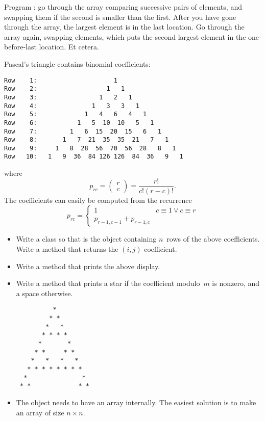 \begin{exercise}
  Program : go through the array comparing
  successive pairs of elements, and swapping them if the second is
  smaller than the first. After you have gone through the array, the
  largest element is in the last location. Go through the array again,
  swapping elements, which puts the second largest element in the
  one-before-last location. Et cetera.
\end{exercise}

\begin{block}{Pascal's triangle}
  \label{sl:pascal-def}
  \small
   contains binomial coefficients:
{\scriptsize
\begin{verbatim}
Row    1:                     1
Row    2:                   1   1
Row    3:                 1   2   1
Row    4:               1   3   3   1
Row    5:             1   4   6   4   1
Row    6:           1   5  10  10   5   1
Row    7:         1   6  15  20  15   6   1
Row    8:       1   7  21  35  35  21   7   1
Row    9:     1   8  28  56  70  56  28   8   1
Row   10:   1   9  36  84 126 126  84  36   9   1
\end{verbatim}
}
where \[ p_{rc} = \begin{pmatrix} r\\c \end{pmatrix} = \frac{r!}{c!(r-c)! }. \]
The coefficients can easily be computed from the recurrence
\[ p_{rc} = 
\begin{cases}
  1&c\equiv 1\vee c\equiv r\\
  p_{r-1,c-1}+p_{r-1,c}
\end{cases}
\]
\end{block}

\begin{exercise}
  \label{ex:pascal-ex}
  \small
  \begin{itemize}
  \item 
    Write a class  so that  is the object
    containing $n$~rows of the above coefficients. Write a method
     that returns the $(i,j)$ coefficient.
  \item
    Write a method  that prints the above display.
  \item
    Write a method  that prints a star if the
    coefficient modulo~$m$ is nonzero, and a space otherwise.
\begin{verbatim}
          *
         * *
        *   *
       * * * *
      *       *
     * *     * *
    *   *   *   *
   * * * * * * * *
  *               *
 * *             * *
\end{verbatim}
  \item
    The object needs to have an array internally. The easiest solution
    is to make an array of size $n\times n$.
  \end{itemize}
\end{exercise}

